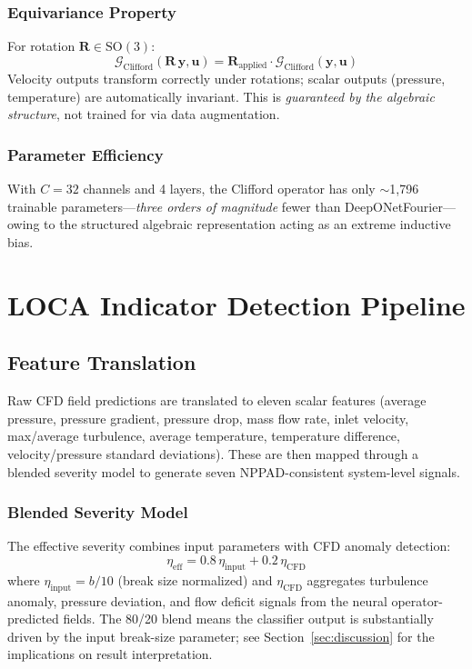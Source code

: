\documentclass[conference]{IEEEtran}
\begin{document}
\subsubsection{Equivariance Property}
For rotation $\bm{R} \in \text{SO}(3)$:
\begin{equation}
\mathcal{G}_\text{Clifford}(\bm{R}\,\bm{y}, \bm{u}) = \bm{R}_\text{applied} \cdot \mathcal{G}_\text{Clifford}(\bm{y}, \bm{u})
\label{eq:equivariance}
\end{equation}
Velocity outputs transform correctly under rotations; scalar outputs (pressure, temperature) are automatically invariant. This is \emph{guaranteed by the algebraic structure}, not trained for via data augmentation.

\subsubsection{Parameter Efficiency}
With $C = 32$ channels and 4 layers, the Clifford operator has only $\sim$1,796 trainable parameters---\emph{three orders of magnitude} fewer than DeepONetFourier---owing to the structured algebraic representation acting as an extreme inductive bias.

\section{LOCA Indicator Detection Pipeline}
\label{sec:pipeline}

\subsection{Feature Translation}

Raw CFD field predictions are translated to eleven scalar features (average pressure, pressure gradient, pressure drop, mass flow rate, inlet velocity, max/average turbulence, average temperature, temperature difference, velocity/pressure standard deviations). These are then mapped through a blended severity model to generate seven NPPAD-consistent system-level signals.

\subsubsection{Blended Severity Model}
The effective severity combines input parameters with CFD anomaly detection:
\begin{equation}
\eta_\text{eff} = 0.8\,\eta_\text{input} + 0.2\,\eta_\text{CFD}
\label{eq:severity}
\end{equation}
where $\eta_\text{input} = b/10$ (break size normalized) and $\eta_\text{CFD}$ aggregates turbulence anomaly, pressure deviation, and flow deficit signals from the neural operator-predicted fields. The 80/20 blend means the classifier output is substantially driven by the input break-size parameter; see Section~\ref{sec:discussion} for the implications on result interpretation.
\end{document}
